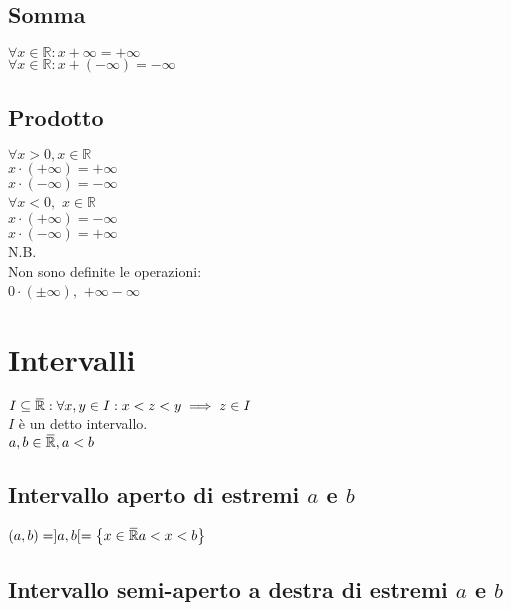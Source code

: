\documentclass[a4paper, twoside, italian, 11pt]{book}
\newcommand{\braces}[1] {\left\{#1\right\}}
\newcommand{\overbar}[1]{\mkern 1.5mu\overline{\mkern-1.5mu#1\mkern-1.5mu}\mkern 1.5mu}
\newcommand{\R}{\mathbb{R}}
\begin{document}
\subsection{Somma}

\noindent
$\forall x \in \R: x + \infty = +\infty$ \\
$\forall x \in \R: x + (-\infty) = -\infty$


\subsection{Prodotto}

\noindent
$\forall x > 0, x \in \R$ \\
$x \cdot (+\infty) = +\infty$ \\
$x \cdot (-\infty) = -\infty$ \\


\noindent
$\forall x < 0,$ $x \in \R$ \\
$x \cdot (+\infty) = -\infty$ \\
$x \cdot (-\infty) = +\infty$ \\

\noindent
N.B. \\
Non sono definite le operazioni: \\
$0 \cdot (\pm \infty),$ $+ \infty - \infty$



\section{Intervalli}

\noindent
$I \subseteq \overbar \R : \forall x, y \in I : x < z < y \implies z \in I$ \\
$I$ è un detto intervallo. \\

\noindent
$a, b \in \overbar \R, a < b$ \\


\subsection{Intervallo aperto di estremi $a$ e $b$}

\noindent
$(a, b) = ]a, b[ = \braces{ x \in \overbar \R a < x < b}$ \\


\subsection{Intervallo semi-aperto a destra di estremi $a$ e $b$}
\end{document}
